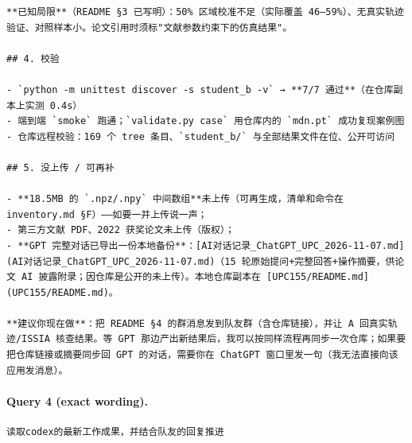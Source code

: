 \documentclass[UTF8,10pt]{ctexart}
\begin{document}
\begin{Verbatim}[breaklines=true,breakanywhere=true,fontsize=\scriptsize,frame=single,framesep=2pt]
**已知局限**（README §3 已写明）：50% 区域校准不足（实际覆盖 46–59%）、无真实轨迹验证、对照样本小。论文引用时须标"文献参数约束下的仿真结果"。

## 4. 校验

- `python -m unittest discover -s student_b -v` → **7/7 通过**（在仓库副本上实测 0.4s）
- 端到端 `smoke` 跑通；`validate.py case` 用仓库内的 `mdn.pt` 成功复现案例图
- 仓库远程校验：169 个 tree 条目、`student_b/` 与全部结果文件在位、公开可访问

## 5. 没上传 / 可再补

- **18.5MB 的 `.npz/.npy` 中间数组**未上传（可再生成，清单和命令在 inventory.md §F）——如要一并上传说一声；
- 第三方文献 PDF、2022 获奖论文未上传（版权）；
- **GPT 完整对话已导出一份本地备份**：[AI对话记录_ChatGPT_UPC_2026-11-07.md](AI对话记录_ChatGPT_UPC_2026-11-07.md)（15 轮原始提问+完整回答+操作摘要，供论文 AI 披露附录；因仓库是公开的未上传）。本地仓库副本在 [UPC155/README.md](UPC155/README.md)。

**建议你现在做**：把 README §4 的群消息发到队友群（含仓库链接），并让 A 回真实轨迹/ISSIA 核查结果。等 GPT 那边产出新结果后，我可以按同样流程再同步一次仓库；如果要把仓库链接或摘要同步回 GPT 的对话，需要你在 ChatGPT 窗口里发一句（我无法直接向该应用发消息）。
\end{Verbatim}

\paragraph{Query 4 (exact wording).}
\begin{Verbatim}[breaklines=true,breakanywhere=true,fontsize=\scriptsize,frame=single,framesep=2pt]
读取codex的最新工作成果，并结合队友的回复推进
\end{Verbatim}
\end{document}
